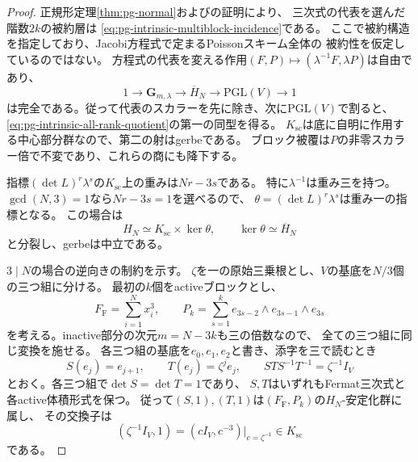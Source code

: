 \begin{proof}
正規形定理\ref{thm:pg-normal}および\cite[相対Poisson階数層の記述]{PoissonCubic}の証明により、
三次式の代表を選んだ階数$2k$の被約層は
\eqref{eq:pg-intrinsic-multiblock-incidence}である。
ここで被約構造を指定しており、Jacobi方程式で定まるPoissonスキーム全体の
被約性を仮定しているのではない。
方程式の代表を変える作用$(F,P)\mapsto(\lambda^{-1}F,\lambda P)$は自由であり、
\begin{equation}
 1\longrightarrow\mathbf G_{m,\lambda}
 \longrightarrow\overline H_N
 \longrightarrow\mathrm{PGL}(V)\longrightarrow1
 \label{eq:pg-intrinsic-all-rank-effective-group}
\end{equation}
は完全である。従って代表のスカラーを先に除き、次に$\mathrm{PGL}(V)$で割ると、
\eqref{eq:pg-intrinsic-all-rank-quotient}の第一の同型を得る。
$K_{\mathrm{sc}}$は底に自明に作用する中心部分群なので、第二の射はgerbeである。
ブロック被覆は$P$の非零スカラー倍で不変であり、これらの商にも降下する。

指標$(\det L)^r\lambda^s$の$K_{\mathrm{sc}}$上の重みは$Nr-3s$である。
特に$\lambda^{-1}$は重み三を持つ。
$\gcd(N,3)=1$なら$Nr-3s=1$を選べるので、
$\theta=(\det L)^r\lambda^s$は重み一の指標となる。
この場合は
\begin{equation}
 H_N\simeq K_{\mathrm{sc}}\times\ker\theta,
 \qquad\ker\theta\simeq\overline H_N
 \label{eq:pg-intrinsic-all-rank-neutralization}
\end{equation}
と分裂し、gerbeは中立である。

$3\mid N$の場合の逆向きの制約を示す。
$\zeta$を一の原始三乗根とし、$V$の基底を$N/3$個の三つ組に分ける。
最初の$k$個をactiveブロックとし、
\begin{equation}
 F_{\mathrm F}=\sum_{i=1}^N x_i^3,\qquad
 P_k=\sum_{s=1}^k
 e_{3s-2}\wedge e_{3s-1}\wedge e_{3s}
 \label{eq:pg-intrinsic-period-fermat-point}
\end{equation}
を考える。inactive部分の次元$m=N-3k$も三の倍数なので、
全ての三つ組に同じ変換を施せる。
各三つ組の基底を$e_0,e_1,e_2$と書き、添字を三で読むとき
\begin{equation}
 S(e_j)=e_{j+1},\qquad T(e_j)=\zeta^j e_j,
 \qquad STS^{-1}T^{-1}=\zeta^{-1}I_V
 \label{eq:pg-intrinsic-period-heisenberg-commutator}
\end{equation}
とおく。各三つ組で$\det S=\det T=1$であり、
$S,T$はいずれもFermat三次式と各active体積形式を保つ。
従って$(S,1),(T,1)$は$(F_{\mathrm F},P_k)$の$H_N$-安定化群に属し、
その交換子は
\begin{equation}
 (\zeta^{-1}I_V,1)
   =(cI_V,c^{-3})\big|_{c=\zeta^{-1}}\in K_{\mathrm{sc}}
 \label{eq:pg-intrinsic-period-scalar-commutator}
\end{equation}
である。


\end{proof}
